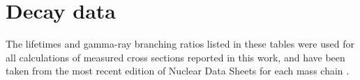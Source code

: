 \documentclass[3p]{elsarticle}
\newcommand{\comment}[1]{\todo[color=blue!20!white,inline]{ASV: #1}}
\begin{document}
% 
% 
\appendix


\section{Decay data} \label{data}
% 
The   lifetimes and gamma-ray branching ratios  listed in these tables were used for all calculations of measured cross sections reported in this work, and have been taken from the most recent edition of  Nuclear Data Sheets for each  mass chain  \cite{Basunia2015,Firestone2007,Wang2017,Dong2015,Dong2014,JUNDE2008787,Junde2011,Bhat1998,Nesaraja2010,BAGLIN2002,Browne2013,Zuber20151,NICHOLS2012973,Singh2007,Browne2010,Tuli2003,McCutchan2015,Singh2014,NEGRET20151,Johnson2015,McCutchan2014,Singh2013,Browne1997,Baglin2013,Baglin2012,Baglin2011}. 




\end{document}
